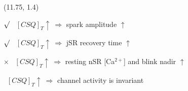 \documentclass[a0]{a0poster}
\def\Ca{Ca$^{2+}$}
\begin{document}
\begin{textblock}{5.5}(11.75, 1.4)



\hspace{2in} {$\surd$} \ $[CSQ]_T \uparrow\ \Rightarrow$ spark amplitude $\uparrow$

\vspace{-0.1in} \hspace{2in} {$\surd$} \ $[CSQ]_T \uparrow\ \Rightarrow$ jSR recovery time $\uparrow$

\vspace{-0.1in} \hspace{2in}  {$\times$} \ $[CSQ]_T \uparrow\ \Rightarrow$ resting nSR [\Ca] and blink nadir $\uparrow$

\vspace{-0.1in} \hspace{2.35in} \ $[CSQ]_T \uparrow\ \Rightarrow$ channel activity is invariant



\end{textblock}
\end{document}

